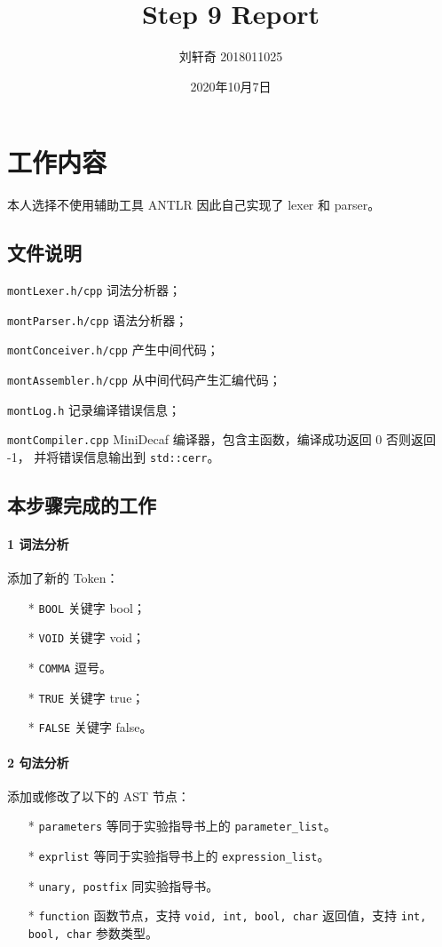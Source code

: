 \documentclass[UTF8]{ctexart}
\title{Step 9 Report}
\author{刘轩奇 2018011025}
\date{2020年10月7日}
\newcommand{\T}[1]{\texttt{{#1}}}
\begin{document}
    \maketitle
    \section{工作内容}
        本人选择不使用辅助工具 ANTLR 因此自己实现了 lexer 和 parser。
        \subsection{文件说明} 
            \T{montLexer.h/cpp} 词法分析器；

            \T{montParser.h/cpp} 语法分析器；

            \T{montConceiver.h/cpp} 产生中间代码；

            \T{montAssembler.h/cpp} 从中间代码产生汇编代码；
            
            \T{montLog.h} 记录编译错误信息；

            \T{montCompiler.cpp} MiniDecaf 编译器，包含主函数，编译成功返回 0 否则返回 -1，
            并将错误信息输出到 \T{std::cerr}。
        
        \subsection{本步骤完成的工作}

            \paragraph{1 词法分析} 添加了新的 Token：
            \begin{itemize}
                \item[*] \T{BOOL} 关键字 bool；
                \item[*] \T{VOID} 关键字 void；
                \item[*] \T{COMMA} 逗号。
                \item[*] \T{TRUE} 关键字 true；
                \item[*] \T{FALSE} 关键字 false。   
            \end{itemize}

            \paragraph{2 句法分析} 添加或修改了以下的 AST 节点：
            \begin{itemize}
                \item[*] \T{parameters} 等同于实验指导书上的 \T{parameter\_list}。
                \item[*] \T{exprlist} 等同于实验指导书上的 \T{expression\_list}。
                \item[*] \T{unary, postfix} 同实验指导书。
                \item[*] \T{function} 函数节点，支持 \T{void, int, bool, char} 返回值，支持
                    \T{int, bool, char} 参数类型。
            \end{itemize}
\end{document}
